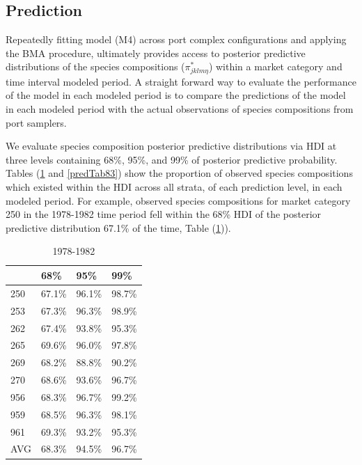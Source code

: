 \documentclass[12pt]{article}
\begin{document}
\subsection{Prediction}\label{prediction}

Repeatedly fitting model (M4) across port complex configurations and
applying the BMA procedure, ultimately provides access to posterior
predictive distributions of the species compositions
(\(\pi^*_{jklm\eta}\)) within a market category and time interval
modeled period. A straight forward way to evaluate the performance of
the model in each modeled period is to compare the predictions of the
model in each modeled period with the actual observations of species
compositions from port samplers.

We evaluate species composition posterior predictive distributions via
HDI at three levels containing 68\%, 95\%, and 99\% of posterior
predictive probability. Tables (\ref{predTab78} and \ref{predTab83}) 
show the proportion of observed species compositions which existed within the 
HDI across all strata, of each prediction level, in each modeled period. For 
example, observed species compositions for market category 250 in the 
1978-1982 time period fell within the 68\% HDI of the posterior 
predictive distribution 67.1\% of the time, Table (\ref{predTab78})).

\begin{table}[h!]
\centering
\begin{tabular}[c]{@{}llll@{}}
\hline
& 68\% & 95\% & 99\% \\ \hline
250 & 67.1\% & 96.1\% & 98.7\% \\
253 & 67.3\% & 96.3\% & 98.9\% \\ 
262 & 67.4\% & 93.8\% & 95.3\% \\
265 & 69.6\% & 96.0\% & 97.8\% \\
269 & 68.2\% & 88.8\% & 90.2\% \\
270 & 68.6\% & 93.6\% & 96.7\% \\
956 & 68.3\% & 96.7\% & 99.2\% \\
959 & 68.5\% & 96.3\% & 98.1\% \\
961 & 69.3\% & 93.2\% & 95.3\% \\
AVG & 68.3\% & 94.5\% & 96.7\% \\ \hline
\end{tabular}
\caption{1978-1982}
\label{predTab78}
\end{table}
\end{document}

